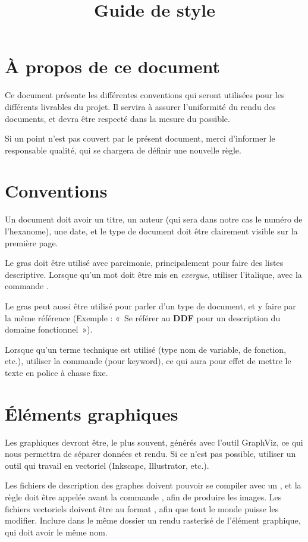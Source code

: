 

\title{Guide de style}


\maketitle
\section{À propos de ce document}
Ce document présente les différentes conventions qui seront utilisées pour les
différents livrables du projet. Il servira à assurer l'uniformité du rendu des
documents, et devra être respecté dans la mesure du possible.

Si un point n'est pas couvert par le présent document, merci d'informer le
responsable qualité, qui se chargera de définir une nouvelle règle.

\section{Conventions}
Un document doit avoir un titre, un auteur (qui sera dans notre cas le numéro
de l'hexanome), une date, et le type de document doit être clairement visible
sur la première page.

Le gras doit être utilisé avec parcimonie, principalement pour faire des listes
descriptive. Lorsque qu'un mot doit être mis en \emph{exergue}, utiliser l'italique,
avec la commande .

Le gras peut aussi être utilisé pour parler d'un type de document, et y faire
par la même référence (Exemple : «~Se référer au \textbf{DDF} pour un
description du domaine fonctionnel~»).

Lorsque qu'un terme technique est utilisé (type nom de variable, de fonction,
etc.), utiliser la commande  (pour keyword), ce qui aura pour effet de
mettre le texte en police à chasse fixe.

\section{Éléments graphiques}
Les graphiques devront être, le plus souvent, générés avec l'outil GraphViz, ce
qui nous permettra de séparer données et rendu. Si ce n'est pas possible,
utiliser un outil qui travail en vectoriel (Inkscape, Illustrator, etc.).

Les fichiers de description des graphes doivent pouvoir se compiler avec un
, et la règle doit être appelée avant la commande ,
afin de produire les images.
Les fichiers vectoriels doivent être au format , afin que tout le monde
puisse les modifier. Inclure dans le même dossier un rendu rasterisé de
l'élément graphique, qui doit avoir le même nom.

